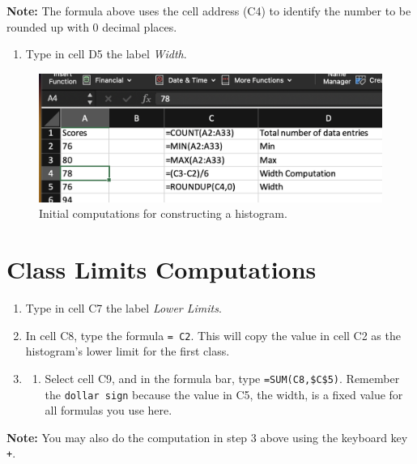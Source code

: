 \documentclass[
]{book}
\providecommand{\tightlist}{%
  \setlength{\itemsep}{0pt}\setlength{\parskip}{0pt}}
\begin{document}
\textbf{Note:} The formula above uses the cell address (C4) to identify the number to be rounded up with 0 decimal places.

\begin{enumerate}
\def\labelenumi{\arabic{enumi}.}
\setcounter{enumi}{9}
\tightlist
\item
  Type in cell D5 the label \emph{Width}.
\end{enumerate}

\begin{figure}

{\centering \includegraphics[width=0.6\linewidth]{initial-comp} 

}

\caption{Initial computations for constructing a histogram.}\label{fig:initial-comp}
\end{figure}

\hypertarget{class-limits-computations}{%
\section{Class Limits Computations}\label{class-limits-computations}}

\begin{enumerate}
\def\labelenumi{\arabic{enumi}.}
\item
  Type in cell C7 the label \emph{Lower Limits}.
\item
  In cell C8, type the formula \texttt{=\ C2}. This will copy the value in cell C2 as the histogram's lower limit for the first class.
\item
  \begin{enumerate}
  \def\labelenumii{\arabic{enumii})}
  \setcounter{enumii}{2}
  \tightlist
  \item
    Select cell C9, and in the formula bar, type \texttt{=SUM(C8,\$C\$5)}. Remember the \texttt{dollar\ sign} because the value in C5, the width, is a fixed value for all formulas you use here.
  \end{enumerate}
\end{enumerate}

\textbf{Note:} You may also do the computation in step 3 above using the keyboard key \texttt{+}.
\end{document}
